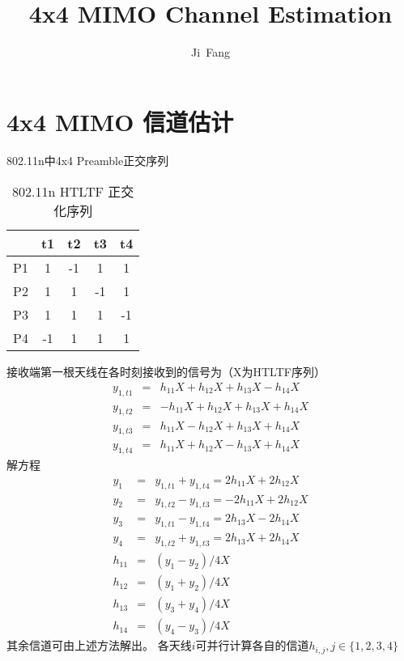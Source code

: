 \documentclass{article}
\begin{document}
\title{4x4 MIMO Channel Estimation}
\author{Ji~Fang}

\maketitle


\section{4x4 MIMO 信道估计}

802.11n中4x4 Preamble正交序列
\begin{table}[tbh]
\centering
\begin{tabular}{c|c|c|c|c}
\hline
 & t1 & t2 & t3 & t4 \\
\hline
P1 & 1  & -1 & 1 & 1 \\
P2 & 1  & 1 & -1 & 1 \\
P3 & 1  & 1 & 1 & -1 \\
P4 & -1  & 1 & 1 & 1 \\
\hline
\end{tabular}
\caption{802.11n HTLTF 正交化序列}
\label{tab:dot11nHTLTFOtho}
\end{table}

接收端第一根天线在各时刻接收到的信号为（X为HTLTF序列）
\begin{eqnarray}
y_{1, t1} & = & h_{11}X + h_{12}X + h_{13}X - h_{14}X \\
y_{1, t2} & = & -h_{11}X + h_{12}X + h_{13}X + h_{14}X \\
y_{1, t3} & = & h_{11}X - h_{12}X + h_{13}X + h_{14}X \\
y_{1, t4} & = & h_{11}X + h_{12}X - h_{13}X + h_{14}X
\end{eqnarray}
解方程
\begin{eqnarray}
y_{1} & = & y_{1, t1} + y_{1, t4} = 2h_{11}X  + 2h_{12}X  \\
y_{2} & = & y_{1, t2} -  y_{1, t3} = -2h_{11}X  + 2h_{12}X   \\
y_{3} & = & y_{1, t1} - y_{1, t4} = 2h_{13}X  - 2h_{14}X  \\
y_{4} & = & y_{1, t2} + y_{1, t3} = 2h_{13}X  + 2h_{14}X  \\
h_{11} & = & (y_{1} - y_{2}) / 4X \\
h_{12} & = & (y_{1} + y_{2}) / 4X \\
h_{13} & = & (y_{3} + y_{4}) / 4X  \\
h_{14} & = & (y_{4} - y_{3}) / 4X
\end{eqnarray}
其余信道可由上述方法解出。
各天线$i$可并行计算各自的信道$h_{i, j}, j \in \{1, 2, 3, 4\}$
\end{document}
